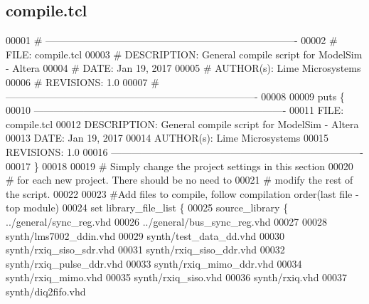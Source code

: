 \subsection{compile.\+tcl}
\label{rx__path__top_2diq2fifo_2compile_8tcl_source}

\begin{DoxyCode}
00001 \textcolor{comment}{# ---------------------------------------------------------------------------- }
00002 \textcolor{comment}{}\textcolor{comment}{# FILE:    compile.tcl}
00003 \textcolor{comment}{}\textcolor{comment}{# DESCRIPTION: General compile script for ModelSim - Altera}
00004 \textcolor{comment}{}\textcolor{comment}{# DATE:    Jan 19, 2017}
00005 \textcolor{comment}{}\textcolor{comment}{# AUTHOR(s):   Lime Microsystems}
00006 \textcolor{comment}{}\textcolor{comment}{# REVISIONS: 1.0}
00007 \textcolor{comment}{}\textcolor{comment}{# ----------------------------------------------------------------------------}
00008 \textcolor{comment}{}
00009 \textcolor{keyword}{puts} \{
00010  ----------------------------------------------------------------------------  
00011  FILE:     compile.tcl
00012  DESCRIPTION:  General compile script for ModelSim - Altera
00013  DATE: Jan 19, 2017
00014  AUTHOR(s):    Lime Microsystems
00015  REVISIONS: 1.0
00016  ----------------------------------------------------------------------------
00017 \}\textcolor{comment}{}
00018 \textcolor{comment}{}
00019 \textcolor{comment}{# Simply change the project settings in this section}
00020 \textcolor{comment}{}\textcolor{comment}{# for each new project. There should be no need to}
00021 \textcolor{comment}{}\textcolor{comment}{# modify the rest of the script.}
00022 \textcolor{comment}{}
00023 \textcolor{comment}{#Add files to compile, follow compilation order(last file - top module)}
00024 \textcolor{comment}{}\textcolor{keyword}{set} library\_file\_list \{
00025                            source\_library \{ ../general/sync\_reg.vhd
00026                                             ../general/bus\_sync\_reg.vhd
00027                                             
00028                                             synth/lms7002\_ddin.vhd
00029                                             synth/test\_data\_dd.vhd
00030                                             synth/rxiq\_siso\_sdr.vhd
00031                                             synth/rxiq\_siso\_ddr.vhd
00032                                             synth/rxiq\_pulse\_ddr.vhd
00033                                             synth/rxiq\_mimo\_ddr.vhd
00034                                             synth/rxiq\_mimo.vhd
00035                                             synth/rxiq\_siso.vhd
00036                                             synth/rxiq.vhd
00037                                             synth/diq2fifo.vhd                                        
         

\end{DoxyCode}
